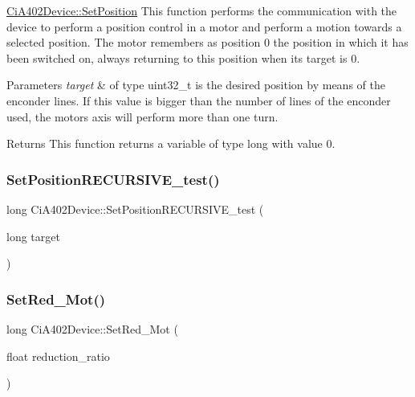 \hyperlink{classCiA402Device_ac13cd5d90f8d39e1ef9734d035e67acb}{Ci\+A402\+Device\+::\+Set\+Position} This function performs the communication with the device to perform a position control in a motor and perform a motion towards a selected position. The motor remembers as position 0 the position in which it has been switched on, always returning to this position when its target is 0. 


\begin{DoxyParams}{Parameters}
{\em target} & of type uint32\+\_\+t is the desired position by means of the enconder lines. If this value is bigger than the number of lines of the enconder used, the motor\textquotesingle{}s axis will perform more than one turn. \\
\hline
\end{DoxyParams}
\begin{DoxyReturn}{Returns}
This function returns a variable of type long with value 0. 
\end{DoxyReturn}
\mbox{\label{classCiA402Device_ac1c55984abb91928d52b0a49651cc18e}} 
\subsubsection{\texorpdfstring{Set\+Position\+R\+E\+C\+U\+R\+S\+I\+V\+E\+\_\+test()}{SetPositionRECURSIVE\_test()}}
{\footnotesize\ttfamily long Ci\+A402\+Device\+::\+Set\+Position\+R\+E\+C\+U\+R\+S\+I\+V\+E\+\_\+test (\begin{DoxyParamCaption}\item[{long}]{target }\end{DoxyParamCaption})}

\mbox{\label{classCiA402Device_ad5b57f2ddfc103644daf157dcd6ab34e}} 
\subsubsection{\texorpdfstring{Set\+Red\+\_\+\+Mot()}{SetRed\_Mot()}}
{\footnotesize\ttfamily long Ci\+A402\+Device\+::\+Set\+Red\+\_\+\+Mot (\begin{DoxyParamCaption}\item[{float}]{reduction\+\_\+ratio }\end{DoxyParamCaption})}




